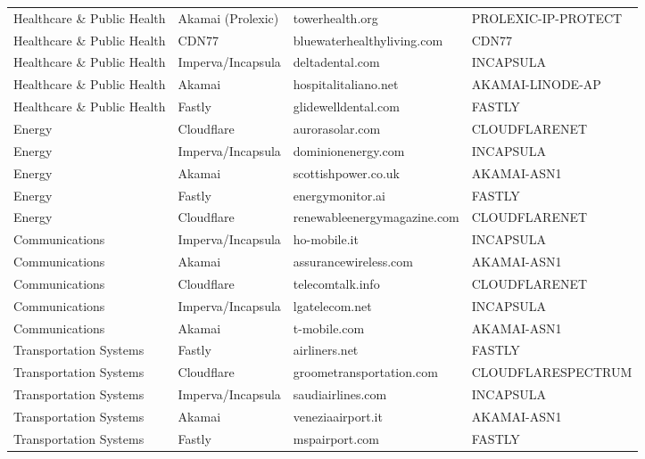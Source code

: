 \documentclass{article}
\begin{document}
\begin{longtable}{l l l l}
Healthcare \& Public Health & Akamai (Prolexic) & towerhealth.org & PROLEXIC-IP-PROTECT \\
Healthcare \& Public Health & CDN77 & bluewaterhealthyliving.com & CDN77 \\
Healthcare \& Public Health & Imperva/Incapsula & deltadental.com & INCAPSULA \\
Healthcare \& Public Health & Akamai & hospitalitaliano.net & AKAMAI-LINODE-AP \\
Healthcare \& Public Health & Fastly & glidewelldental.com & FASTLY \\
Energy & Cloudflare & aurorasolar.com & CLOUDFLARENET \\
Energy & Imperva/Incapsula & dominionenergy.com & INCAPSULA \\
Energy & Akamai & scottishpower.co.uk & AKAMAI-ASN1 \\
Energy & Fastly & energymonitor.ai & FASTLY \\
Energy & Cloudflare & renewableenergymagazine.com & CLOUDFLARENET \\
Communications & Imperva/Incapsula & ho-mobile.it & INCAPSULA \\
Communications & Akamai & assurancewireless.com & AKAMAI-ASN1 \\
Communications & Cloudflare & telecomtalk.info & CLOUDFLARENET \\
Communications & Imperva/Incapsula & lgatelecom.net & INCAPSULA \\
Communications & Akamai & t-mobile.com & AKAMAI-ASN1 \\
Transportation Systems & Fastly & airliners.net & FASTLY \\
Transportation Systems & Cloudflare & groometransportation.com & CLOUDFLARESPECTRUM \\
Transportation Systems & Imperva/Incapsula & saudiairlines.com & INCAPSULA \\
Transportation Systems & Akamai & veneziaairport.it & AKAMAI-ASN1 \\
Transportation Systems & Fastly & mspairport.com & FASTLY \\
\end{longtable}
\end{document}
